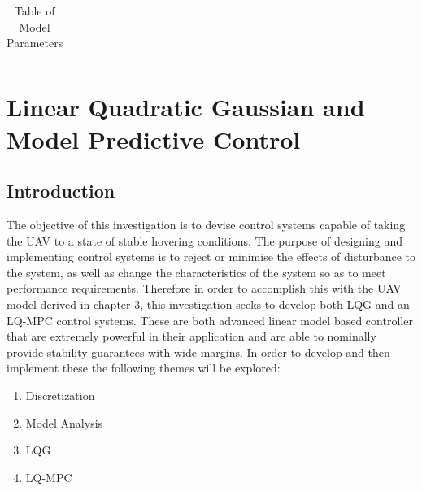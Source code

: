 \documentclass[12pt,a4paper,twoside]{report}
\begin{document}
\begin{table}[h!]
\begin{tabular}{ |p{1.5cm}||p{9.5cm}|p{5cm}|  }
				\hline
			\end{tabular}
			\caption{Table of Model Parameters}
			\label{table:modelparameters}
			\end{table}
			
			\newpage
			
	\chapter{Linear Quadratic Gaussian and Model Predictive Control}
		
		\section{Introduction}
		
			The objective of this investigation is to devise control systems capable of taking the UAV to a state of stable hovering conditions. The purpose of designing and implementing control systems is to reject or minimise the effects of disturbance to the system, as well as change the characteristics of the system so as to meet performance requirements. Therefore in order to accomplish this with the UAV model derived in chapter 3, this investigation seeks to develop both LQG and an LQ-MPC control systems. These are both advanced linear model based controller that are extremely powerful in their application and are able to nominally provide stability guarantees with wide margins. In order to develop and then implement these the following themes will be explored:
		 
			\begin{enumerate}
				\item 
					Discretization
				\item 
					Model Analysis
				\item 
					LQG
				\item
					LQ-MPC
			\end{enumerate}
		
\end{document}
